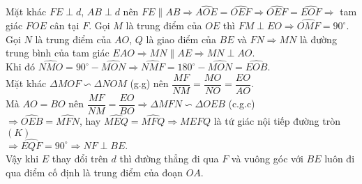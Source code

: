 \begin{bt}
{		Mặt khác $ FE\perp d $, $ AB\perp d $ nên $ FE\parallel AB\Rightarrow \widehat{AOE}=\widehat{OEF}\Rightarrow \widehat{OEF}=\widehat{EOF}\Rightarrow $ tam giác $ FOE $ cân tại $ F $. Gọi $M$ là trung điểm của $OE$ thì $ FM\perp EO\Rightarrow \widehat{OMF}=90^{\circ}$.\\
	 	Gọi $ N $ là trung điểm của $ AO $, $ Q $ là giao điểm của $ BE $ và $ FN \Rightarrow MN$ là đường trung bình của tam giác $ EAO\Rightarrow MN\parallel AE\Rightarrow MN\perp AO$.\\
		Khi đó $\widehat{NMO}=90^{\circ}-\widehat{MON}\Rightarrow \widehat{NMF}=180^{\circ}-\widehat{MON}=\widehat{EOB} $.\\
		Mặt khác $ \Delta MOF\backsim \Delta NOM $ (g.g) nên $ \dfrac{MF}{NM}=\dfrac{MO}{NO}=\dfrac{EO}{AO} $.\\
		Mà $ AO=BO $ nên $ \dfrac{MF}{NM}=\dfrac{EO}{BO}\Rightarrow \Delta MFN\backsim\Delta OEB $ (c.g.c)\\
		$ \Rightarrow \widehat{OEB}=\widehat{MFN} $, hay $ \widehat{MEQ}=\widehat{MFQ}\Rightarrow MEFQ $ là tứ giác nội tiếp đường tròn $ (K)$\\
		$\Rightarrow \widehat{EQF}=90^{\circ}\Rightarrow NF\perp BE $.\\
		Vậy khi $ E $ thay đổi trên $ d $ thì đường thẳng đi qua $ F $ và vuông góc với $ BE $ luôn đi qua điểm cố định là trung điểm của đoạn $ OA $.
	}
\end{bt}



